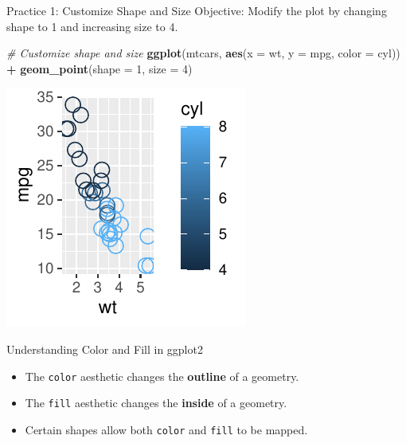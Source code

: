 \documentclass[
  ignorenonframetext,
]{beamer}
\newenvironment{Shaded}{\begin{snugshade}}{\end{snugshade}}
\newcommand{\AttributeTok}[1]{\textcolor[rgb]{0.13,0.29,0.53}{#1}}
\newcommand{\CommentTok}[1]{\textcolor[rgb]{0.56,0.35,0.01}{\textit{#1}}}
\newcommand{\DecValTok}[1]{\textcolor[rgb]{0.00,0.00,0.81}{#1}}
\newcommand{\FunctionTok}[1]{\textcolor[rgb]{0.13,0.29,0.53}{\textbf{#1}}}
\newcommand{\NormalTok}[1]{#1}
\newcommand{\SpecialCharTok}[1]{\textcolor[rgb]{0.81,0.36,0.00}{\textbf{#1}}}
\providecommand{\tightlist}{%
  \setlength{\itemsep}{0pt}\setlength{\parskip}{0pt}}
\begin{document}
\begin{frame}[fragile]{Practice 1: Customize Shape and Size}
\label{practice-1-customize-shape-and-size}
Objective: Modify the plot by changing shape to 1 and increasing size to
4.


\begin{Shaded}
\begin{Highlighting}[]
\CommentTok{\# Customize shape and size}
\FunctionTok{ggplot}\NormalTok{(mtcars, }\FunctionTok{aes}\NormalTok{(}\AttributeTok{x =}\NormalTok{ wt, }\AttributeTok{y =}\NormalTok{ mpg, }\AttributeTok{color =}\NormalTok{ cyl)) }\SpecialCharTok{+} \FunctionTok{geom\_point}\NormalTok{(}\AttributeTok{shape =} \DecValTok{1}\NormalTok{,}
    \AttributeTok{size =} \DecValTok{4}\NormalTok{)}
\end{Highlighting}
\end{Shaded}

\begin{center}\includegraphics[width=0.5\linewidth]{Figs/unnamed-chunk-13-1} \end{center}
\end{frame}

\begin{frame}[fragile]{Understanding Color and Fill in ggplot2}
\label{understanding-color-and-fill-in-ggplot2}
\begin{itemize}
\tightlist
\item
  The \texttt{color} aesthetic changes the \textbf{outline} of a
  geometry.
\item
  The \texttt{fill} aesthetic changes the \textbf{inside} of a geometry.
\item
  Certain shapes allow both \texttt{color} and \texttt{fill} to be
  mapped.
\end{itemize}
\end{frame}
\end{document}
